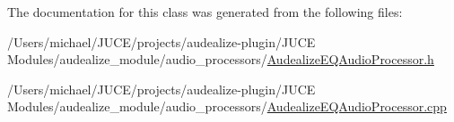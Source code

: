 The documentation for this class was generated from the following files\+:\begin{DoxyCompactItemize}
\item 
/\+Users/michael/\+J\+U\+C\+E/projects/audealize-\/plugin/\+J\+U\+C\+E Modules/audealize\+\_\+module/audio\+\_\+processors/\hyperlink{_audealize_e_q_audio_processor_8h}{Audealize\+E\+Q\+Audio\+Processor.\+h}\item 
/\+Users/michael/\+J\+U\+C\+E/projects/audealize-\/plugin/\+J\+U\+C\+E Modules/audealize\+\_\+module/audio\+\_\+processors/\hyperlink{_audealize_e_q_audio_processor_8cpp}{Audealize\+E\+Q\+Audio\+Processor.\+cpp}\end{DoxyCompactItemize}

